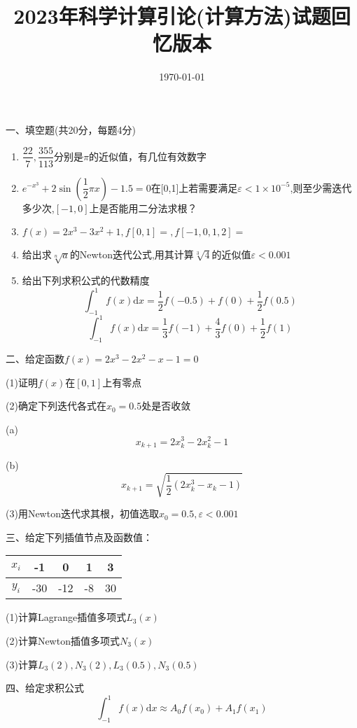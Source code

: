 \documentclass[a4paper,11pt,UTF8]{article}
\title{2023年科学计算引论(计算方法)试题回忆版本}
\date{\today}
\begin{document}
\maketitle

\noindent 一、填空题(共20分，每题4分)
\begin{enumerate}
	\item $\dfrac{22}7,\dfrac{355}{113}$分别是$\pi$的近似值，有几位有效数字 
	
	\item $e^{-x^3}+2\sin (\dfrac12\pi x)-1.5=0$在[0,1]上若需要满足$\varepsilon<1\times 10^{-5}$,则至少需迭代多少次,$[-1,0]$上是否能用二分法求根？
	
	\item $f(x)=2x^3-3x^2+1,f[0,1]=,f[-1,0,1,2]=$
	
	\item 给出求$\sqrt[n]{a}$的Newton迭代公式,用其计算$\sqrt[3]{4}$的近似值$\varepsilon<0.001$
	
	\item 给出下列求积公式的代数精度$$
	\int_{-1}^1f(x)\mathrm{d}x=\frac12f(-0.5)+f(0)+\frac12f(0.5)$$
	$$
	\int_{-1}^1f(x)\mathrm{d}x=\frac13f(-1)+\frac43f(0)+\frac12f(1)
	$$
\end{enumerate}
\noindent 二、给定函数$f(x)=2x^3-2x^2-x-1=0$

(1)证明$f(x)$在$[0,1]$上有零点

(2)确定下列迭代各式在$x_0=0.5$处是否收敛

(a)
$$
x_{k+1}=2x_k^3-2x_k^2-1
$$

(b)
$$
x_{k+1}=\sqrt{\frac12(2x_k^3-x_k-1)}
$$

(3)用Newton迭代求其根，初值选取$x_0=0.5,\varepsilon<0.001$

\noindent 三、给定下列插值节点及函数值：
\begin{table}[h]
	\centering
	\begin{tabular}{|c|c|c|c|c|}
		\hline
		$x_i$ &-1  &  0   &  1   &  3   \\
		\hline
		$y_i$ & -30  & -12  &  -8  &  30  \\
		\hline
	\end{tabular}
\end{table}

(1)计算Lagrange插值多项式$L_3(x)$

(2)计算Newton插值多项式$N_3(x)$

(3)计算$L_3(2),N_3(2),L_3(0.5),N_3(0.5)$

\noindent 四、给定求积公式
$$
\int_{-1}^1f(x)\mathrm{d}x\approx A_0f(x_0)+A_1f(x_1)
$$
\end{document}
